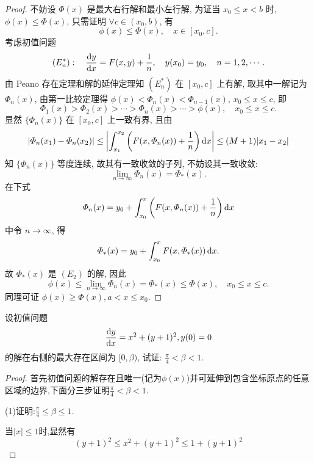 \begin{proof}
  不妨设 $\varPhi(x)$ 是最大右行解和最小左行解, 为证当 $x_0\leq x<b$ 时, 
  $\phi(x)\leq\varPhi(x)$, 只需证明 $\forall c\in(x_0,b)$, 有
  \[\phi(x)\leq\varPhi(x),\quad x\in[x_0,c].\]
  考虑初值问题
  \[(E_n^*):\quad \frac{\mathop{}\!\mathrm{d} y}{\mathop{}\!\mathrm{d} x}=F(x,y)+\frac{1}{n},
    \quad y(x_0)=y_0,\quad n=1,2,\cdots.\]
  由 Peano 存在定理和解的延伸定理知 $(E_n^*)$ 在 $[x_0,c]$ 上有解, 取其中一解记为 $\varPhi_n(x)$, 
  由第一比较定理得 $\phi(x)<\varPhi_n(x)<\varPhi_{n-1}(x)$, $x_0\leq x\leq c$, 即
  \[\varPhi_1(x)>\varPhi_2(x)>\cdots>\varPhi_n(x)>\cdots>\phi(x),\quad x_0\leq x\leq c.\]
  显然 $\{\varPhi_n(x)\}$ 在 $[x_0,c]$ 上一致有界, 且由
  \[|\varPhi_n(x_1)-\varPhi_n(x_2)|\leq
    \left|\int_{x_1}^{x_2}\left(F(x,\varPhi_n(x))+\frac{1}{n}\right)\mathop{}\!\mathrm{d} x\right|\leq(M+1)|x_1-x_2|\]
  知 $\{\varPhi_n(x)\}$ 等度连续, 故其有一致收敛的子列, 不妨设其一致收敛:
  \[\lim_{n\to\infty}\varPhi_n(x)=\varPhi_*(x).\]
  在下式
  \[\varPhi_n(x)=y_0+\int_{x_0}^x\left(F(x,\varPhi_n(x))+\frac{1}{n}\right)\mathop{}\!\mathrm{d} x\]
  中令 $n\to\infty$, 得
  \[\varPhi_*(x)=y_0+\int_{x_0}^xF(x,\varPhi_*(x))\mathop{}\!\mathrm{d} x.\]
  故 $\varPhi_*(x)$ 是 $(E_2)$ 的解, 因此
  \[\phi(x)\leq\lim_{n\to\infty}\varPhi_n(x)=\varPhi_*(x)\leq\varPhi(x),\quad x_0\leq x\leq c.\]
  同理可证 $\phi(x)\geq\varPhi(x),a<x\leq x_0$.
\end{proof}



\begin{exercise}
  设初值问题
  \[\frac{\mathop{}\!\mathrm{d} y}{\mathop{}\!\mathrm{d} x}=x^2+(y+1)^2,y(0)=0\]
  的解在右侧的最大存在区间为 $[0,\beta)$, 试证: $\frac{\pi}{4}<\beta<1$.
\end{exercise}

\begin{proof}
  首先初值问题的解存在且唯一(记为$\phi(x)$)并可延伸到包含坐标原点的任意区域的边界,下面分三步证明$\frac{\pi}{4}<\beta<1$.

  (1)证明:$\frac{\pi}{4}\leq\beta\leq1$.

  当$|x|\leq1$时,显然有
  \[(y+1)^2\leq x^2+(y+1)^2\leq1+(y+1)^2\]
\end{proof}